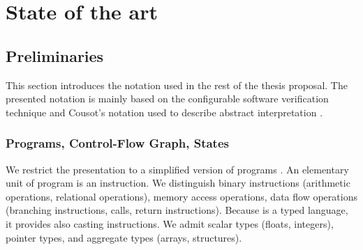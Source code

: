 \chapter{State of the art}
\label{ch:state}



%
%


\section{Preliminaries}

This section introduces the notation used in the rest of the thesis proposal.
The presented notation is mainly based on the configurable software
verification technique \cite{Beyer2007, Beyer2018, Beyer2018b} and Cousot's
notation used to describe abstract interpretation \cite{Cousot2012}.

\subsection{Programs, Control-Flow Graph, States}

We restrict the presentation to a simplified version of \llvm programs
\cite{Lattner04}. An elementary unit of \llvm program is an instruction. We
distinguish binary instructions (arithmetic operations, relational operations),
memory access operations, data flow operations (branching instructions, calls,
return instructions). Because \llvmir is a typed language, it provides also
casting instructions. We admit scalar types (floats, integers), pointer types,
and aggregate types (arrays, structures).

